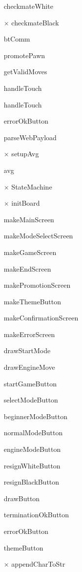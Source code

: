 \documentclass[12pt, titlepage]{article}
\begin{document}
\begin{itemize}
  \item[\checkmark] checkmateWhite
  \item[$\times$] checkmateBlack
  \item[\checkmark] btComm
  \item[\checkmark] promotePawn
  \item[\checkmark] getValidMoves
  \item[\checkmark] handleTouch
  \item[\checkmark] handleTouch
  \item[\checkmark] errorOkButton
  \item[\checkmark] parseWebPayload
  \item[$\times$] setupAvg
  \item[\checkmark] avg
  \item[$\times$] StateMachine
  \item[$\times$] initBoard
  \item[\checkmark] makeMainScreen
  \item[\checkmark] makeModeSelectScreen
  \item[\checkmark] makeGameScreen
  \item[\checkmark] makeEndScreen
  \item[\checkmark] makePromotionScreen
  \item[\checkmark] makeThemeButton
  \item[\checkmark] makeConfirmationScreen
  \item[\checkmark] makeErrorScreen
  \item[\checkmark] drawStartMode
  \item[\checkmark] drawEngineMove
  \item[\checkmark] startGameButton
  \item[\checkmark] selectModeButton
  \item[\checkmark] beginnerModeButton
  \item[\checkmark] normalModeButton
  \item[\checkmark] engineModeButton
  \item[\checkmark] resignWhiteButton
  \item[\checkmark] resignBlackButton
  \item[\checkmark] drawButton
  \item[\checkmark] terminationOkButton
  \item[\checkmark] errorOkButton
  \item[\checkmark] themeButton
  \item[$\times$] appendCharToStr

\end{itemize}
\end{document}
